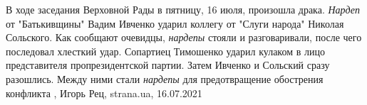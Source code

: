 В ходе заседания Верховной Рады в пятницу, 16 июля, произошла драка.
\emph{Нардеп} от "Батькивщины" Вадим Ивченко ударил коллегу от "Слуги народа"
Николая Сольского.  Как сообщают очевидцы, \emph{нардепы} стояли и
разговаривали, после чего последовал хлесткий удар.  Сопартиец Тимошенко ударил
кулаком в лицо представителя пропрезидентской партии.  Затем Ивченко и Сольский
сразу разошлись. Между ними стали \emph{нардепы} для предотвращение обострения
конфликта
, 
Игорь Рец, strana.ua, 16.07.2021

